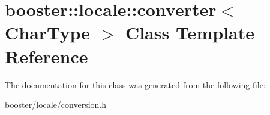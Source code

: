 \section{booster\+:\+:locale\+:\+:converter$<$ Char\+Type $>$ Class Template Reference}
\label{classbooster_1_1locale_1_1converter}


The documentation for this class was generated from the following file\+:\begin{DoxyCompactItemize}
\item 
booster/locale/conversion.\+h\end{DoxyCompactItemize}
